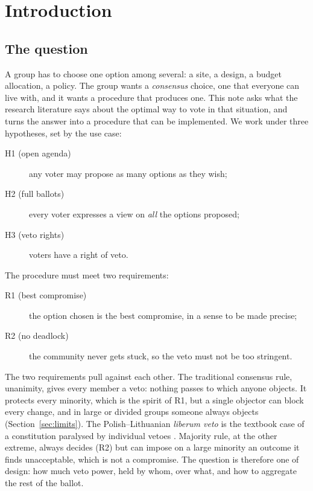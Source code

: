 \section{Introduction}\label{sec:intro}

\subsection{The question}

A group has to choose one option among several: a site, a design, a budget allocation, a policy. The
group wants a \emph{consensus} choice, one that everyone can live with, and it wants a procedure that
produces one. This note asks what the research literature says about the optimal way to vote in that
situation, and turns the answer into a procedure that can be implemented. We work under three
hypotheses, set by the use case:
\begin{description}
  \item[H1 (open agenda)] any voter may propose as many options as they wish;
  \item[H2 (full ballots)] every voter expresses a view on \emph{all} the options proposed;
  \item[H3 (veto rights)] voters have a right of veto.
\end{description}
The procedure must meet two requirements:
\begin{description}
  \item[R1 (best compromise)] the option chosen is the best compromise, in a sense to be made precise;
  \item[R2 (no deadlock)] the community never gets stuck, so the veto must not be too stringent.
\end{description}

The two requirements pull against each other. The traditional consensus rule, unanimity, gives every
member a veto: nothing passes to which anyone objects. It protects every minority, which is the spirit
of R1, but a single objector can block every change, and in large or divided groups someone always
objects (Section~\ref{sec:limits}). The Polish--Lithuanian \emph{liberum veto} is the textbook
case of a constitution paralysed by individual vetoes \citep{Rohac2008}. Majority rule, at the other
extreme, always decides (R2) but can impose on a large minority an outcome it finds unacceptable, which
is not a compromise. The question is therefore one of design: how much veto power, held by whom, over
what, and how to aggregate the rest of the ballot.

